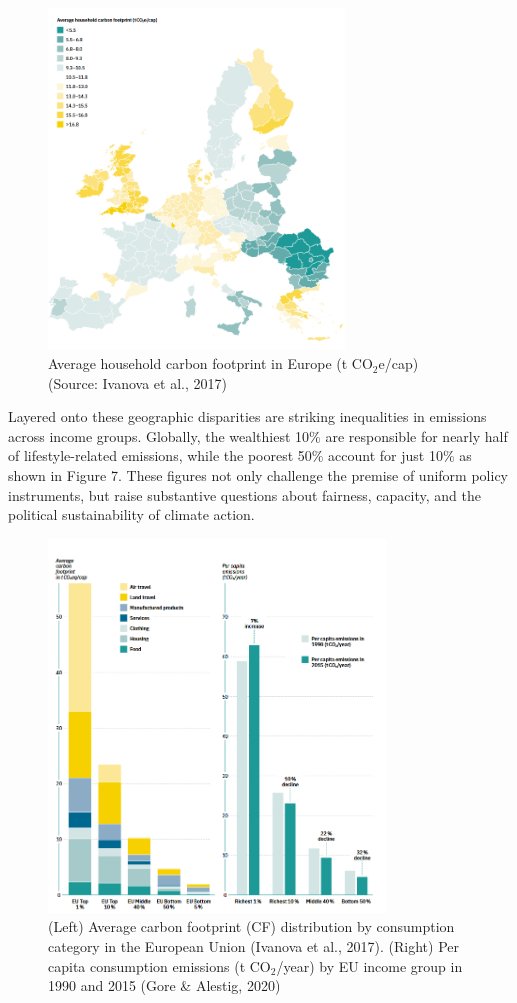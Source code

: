 \documentclass[12pt,a4paper]{article}%
\begin{document}
\begin{figure}[h]
    \centering
    \includegraphics[width=0.7\textwidth]{per capita world emissions.png}
    \caption{\small{Average household carbon footprint in Europe (t CO$_2$e/cap) (Source: Ivanova et al., 2017)}}\label{fig:percapita}
\end{figure}

Layered onto these geographic disparities are striking inequalities in emissions across income groups. Globally, the wealthiest 10\% are responsible for nearly half of lifestyle-related emissions, while the poorest 50\% account for just 10\% as shown in Figure 7. These figures not only challenge the premise of uniform policy instruments, but raise substantive questions about fairness, capacity, and the political sustainability of climate action.
\begin{figure}[h]
    \centering
    \includegraphics[width=0.8\textwidth]{emission by income.png}
    \caption{\small{(Left) Average carbon footprint (CF) distribution by consumption category in the European Union (Ivanova et al., 2017). (Right) Per capita consumption emissions (t CO$_2$/year) by EU income group in 1990 and 2015 (Gore \& Alestig, 2020)}}
\end{figure}
\end{document}
